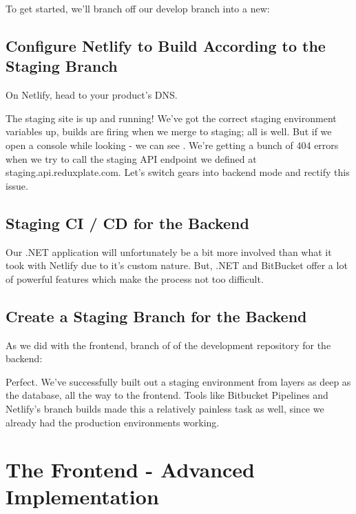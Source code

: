 \documentclass[paper=6in:9in,pagesize=pdftex,headinclude=on,footinclude=on,12pt]{scrbook}
\begin{document}
To get started, we'll branch off our develop branch into a new:

\section{Configure Netlify to Build According to the Staging Branch}

On Netlify, head to your product's DNS.

The staging site is up and running! We've got the correct staging environment variables up, builds are firing when we merge to staging; all is well. But if we open a console while looking - we can see . We're getting a bunch of 404 errors when we try to call the staging API endpoint we defined at staging.api.reduxplate.com. Let's switch gears into backend mode and rectify this issue.

\section{Staging CI / CD for the Backend}

Our .NET application will unfortunately be a bit more involved than what it took with Netlify due to it's custom nature. But, .NET and BitBucket offer a lot of powerful features which make the process not too difficult.

\section{Create a Staging Branch for the Backend}

As we did with the frontend, branch of of the development repository for the backend:


Perfect. We've successfully built out a staging environment from layers as deep as the database, all the way to the frontend. Tools like Bitbucket Pipelines and Netlify's branch builds made this a relatively painless task as well, since we already had the production environments working.

\chapter{The Frontend - Advanced Implementation}
\end{document}
